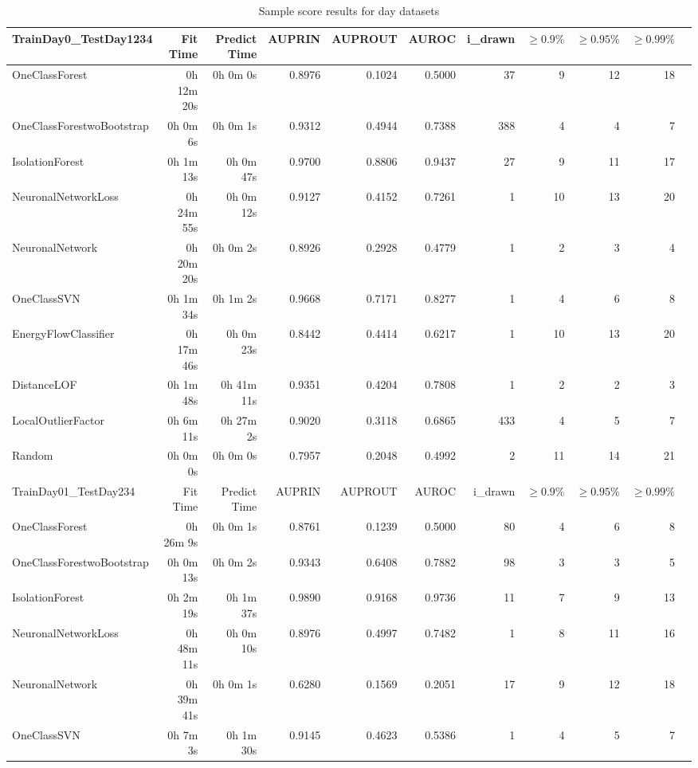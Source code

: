 \documentclass{article}
\begin{document}
\begin{table*}[t]
\centering
\caption{Sample score results for day datasets}
\begin{tabular}{lrrrrrrrrrr}
\toprule
TrainDay0\_TestDay1234 & Fit Time & Predict Time & AUPRIN & AUPROUT & AUROC & i\_drawn & $\geq 0.9\%$ & $\geq 0.95\%$ & $\geq 0.99\%$ \\
\midrule
OneClassForest & 0h 12m 20s & 0h 0m 0s & 0.8976 & 0.1024 & 0.5000 & 37 & 9 & 12 & 18 \\
OneClassForestwoBootstrap & 0h 0m 6s & 0h 0m 1s & 0.9312 & 0.4944 & 0.7388 & 388 & 4 & 4 & 7 \\
IsolationForest & 0h 1m 13s & 0h 0m 47s & 0.9700 & 0.8806 & 0.9437 & 27 & 9 & 11 & 17 \\
NeuronalNetworkLoss & 0h 24m 55s & 0h 0m 12s & 0.9127 & 0.4152 & 0.7261 & 1 & 10 & 13 & 20 \\
NeuronalNetwork & 0h 20m 20s & 0h 0m 2s & 0.8926 & 0.2928 & 0.4779 & 1 & 2 & 3 & 4 \\
OneClassSVN & 0h 1m 34s & 0h 1m 2s & 0.9668 & 0.7171 & 0.8277 & 1 & 4 & 6 & 8 \\
EnergyFlowClassifier & 0h 17m 46s & 0h 0m 23s & 0.8442 & 0.4414 & 0.6217 & 1 & 10 & 13 & 20 \\
DistanceLOF & 0h 1m 48s & 0h 41m 11s & 0.9351 & 0.4204 & 0.7808 & 1 & 2 & 2 & 3 \\
LocalOutlierFactor & 0h 6m 11s & 0h 27m 2s & 0.9020 & 0.3118 & 0.6865 & 433 & 4 & 5 & 7 \\
Random & 0h 0m 0s & 0h 0m 0s & 0.7957 & 0.2048 & 0.4992 & 2 & 11 & 14 & 21 \\
\midrule
TrainDay01\_TestDay234 & Fit Time & Predict Time & AUPRIN & AUPROUT & AUROC & i\_drawn & $\geq 0.9\%$ & $\geq 0.95\%$ & $\geq 0.99\%$ \\
\midrule
OneClassForest & 0h 26m 9s & 0h 0m 1s & 0.8761 & 0.1239 & 0.5000 & 80 & 4 & 6 & 8 \\
OneClassForestwoBootstrap & 0h 0m 13s & 0h 0m 2s & 0.9343 & 0.6408 & 0.7882 & 98 & 3 & 3 & 5 \\
IsolationForest & 0h 2m 19s & 0h 1m 37s & 0.9890 & 0.9168 & 0.9736 & 11 & 7 & 9 & 13 \\
NeuronalNetworkLoss & 0h 48m 11s & 0h 0m 10s & 0.8976 & 0.4997 & 0.7482 & 1 & 8 & 11 & 16 \\
NeuronalNetwork & 0h 39m 41s & 0h 0m 1s & 0.6280 & 0.1569 & 0.2051 & 17 & 9 & 12 & 18 \\
OneClassSVN & 0h 7m 3s & 0h 1m 30s & 0.9145 & 0.4623 & 0.5386 & 1 & 4 & 5 & 7 \\

\end{tabular}
\end{table*}
\end{document}
